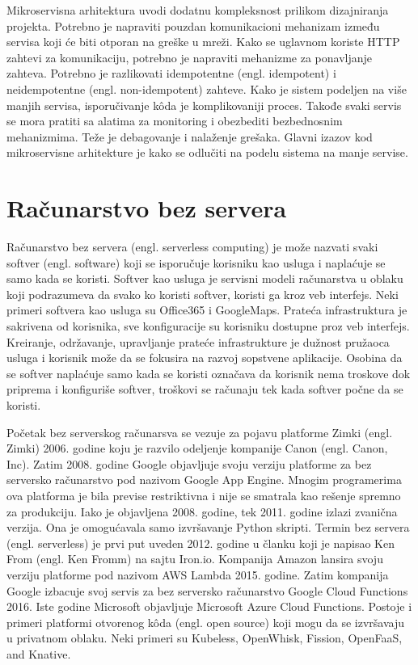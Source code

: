 \documentclass[12pt,oneside]{memoir}
\begin{document}
Mikroservisna arhitektura uvodi dodatnu kompleksnost prilikom dizajniranja projekta. Potrebno je napraviti pouzdan komunikacioni mehanizam između servisa koji će biti otporan na greške u mreži. Kako se uglavnom koriste HTTP zahtevi za komunikaciju, potrebno je napraviti mehanizme za ponavljanje zahteva. Potrebno je razlikovati idempotentne (engl. idempotent) i neidempotentne (engl. non-idempotent) zahteve. Kako je sistem podeljen na više manjih servisa, isporučivanje kôda je komplikovaniji proces. Takođe svaki servis se mora pratiti sa alatima za monitoring i obezbediti bezbednosnim mehanizmima. Teže je debagovanje i nalaženje grešaka. Glavni izazov kod mikroservisne arhitekture je kako se odlučiti na podelu sistema na manje servise\cite{bm}.

\chapter{Računarstvo bez servera}
\label{chp:razrada}

Računarstvo bez servera (engl. serverless computing) je može nazvati svaki softver (engl. software) koji se isporučuje korisniku kao usluga i naplaćuje se samo kada se koristi\cite{sa}. Softver kao usluga je servisni modeli računarstva u oblaku koji podrazumeva da svako ko koristi softver, koristi ga kroz veb interfejs. Neki primeri softvera kao usluga su Office365 i GoogleMaps. Prateća infrastruktura je sakrivena od korisnika, sve konfiguracije su korisniku dostupne proz veb interfejs. Kreiranje, održavanje, upravljanje prateće infrastrukture je dužnost pružaoca usluga i korisnik može da se fokusira na razvoj sopstvene aplikacije. Osobina da se softver naplaćuje samo kada se koristi označava da korisnik nema troskove dok priprema i konfiguriše softver, troškovi se računaju tek kada softver počne da se koristi.

Početak bez serverskog računarsva se vezuje za pojavu platforme Zimki (engl. Zimki) 2006. godine koju je razvilo odeljenje kompanije Canon (engl. Canon, Inc). Zatim 2008. godine Google objavljuje svoju verziju platforme za bez serversko računarstvo pod nazivom Google App Engine. Mnogim programerima ova platforma je bila previse restriktivna i nije se smatrala kao rešenje spremno za produkciju\cite{ls}. Iako je objavljena 2008. godine, tek 2011. godine izlazi zvanična verzija. Ona je omogućavala samo izvršavanje Python skripti. Termin bez servera (engl. serverless) je prvi put uveden 2012. godine u članku koji je napisao Ken From (engl. Ken Fromm) na sajtu Iron.io\cite{wtfosaais}. Kompanija Amazon lansira svoju verziju platforme pod nazivom AWS Lambda 2015. godine. Zatim kompanija Google izbacuje svoj servis za bez serversko računarstvo Google Cloud Functions 2016. Iste godine Microsoft objavljuje Microsoft Azure Cloud Functions. Postoje i primeri platformi otvorenog kôda (engl. open source) koji mogu da se izvršavaju u privatnom oblaku. Neki primeri su Kubeless, OpenWhisk, Fission, OpenFaaS, and Knative\cite{ws}.
\end{document}
